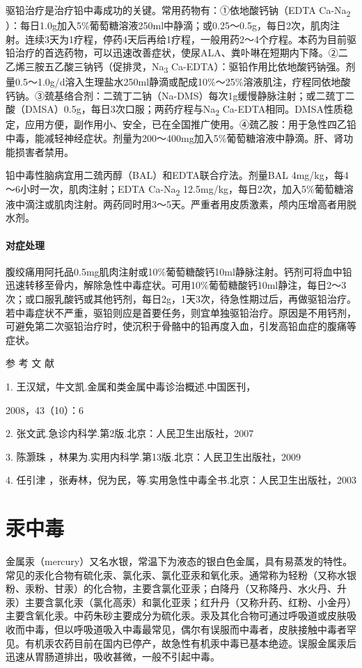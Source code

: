 驱铅治疗是治疗铅中毒成功的关键。常用药物有：①依地酸钙钠（EDTA
Ca-Na\textsubscript{2}
）：每日1.0g加入5\%葡萄糖溶液250ml中静滴；或0.25～0.5g，每日2次，肌肉注射。连续3天为1疗程，停药4天后再给1疗程，一般用药2～4个疗程。本药为目前驱铅治疗的首选药物，可以迅速改善症状，使尿ALA、粪卟啉在短期内下降。②二乙烯三胺五乙酸三钠钙（促排灵，Na\textsubscript{3}
Ca-EDTA）：驱铅作用比依地酸钙钠强。剂量0.5～1.0g/d溶入生理盐水250ml静滴或配成10\%～25\%溶液肌注，疗程同依地酸钙钠。③巯基络合剂：二巯丁二钠（Na-DMS）每次1g缓慢静脉注射；或二巯丁二酸（DMSA）0.5g，每日3次口服；两药疗程与Na\textsubscript{2}
Ca-EDTA相同。DMSA性质稳定，应用方便，副作用小、安全，已在全国推广使用。④巯乙胺：用于急性四乙铅中毒，能减轻神经症状。剂量为200～400mg加入5\%葡萄糖溶液中静滴。肝、肾功能损害者禁用。

铅中毒性脑病宜用二巯丙醇（BAL）和EDTA联合疗法。剂量BAL
4mg/kg，每4～6小时一次，肌肉注射；EDTA Ca-Na\textsubscript{2}
12.5mg/kg，每日2次，加入5\%葡萄糖溶液中滴注或肌肉注射。两药同时用3～5天。严重者用皮质激素，颅内压增高者用脱水剂。

\paragraph{对症处理}

腹绞痛用阿托品0.5mg肌肉注射或10\%葡萄糖酸钙10ml静脉注射。钙剂可将血中铅迅速转移至骨内，解除急性中毒症状。可用10\%葡萄糖酸钙10ml静注，每日2～3次；或口服乳酸钙或其他钙剂，每日2g，1天3次，待急性期过后，再做驱铅治疗。若中毒症状不严重，驱铅则应是首要任务，则宜单独驱铅治疗。原因是不用钙剂，可避免第二次驱铅治疗时，使沉积于骨骼中的铅再度入血，引发高铅血症的腹痛等症状。

\hypertarget{text00157.htmlux5cux23CHP5-6-1-4}{}
参 考 文 献

1. 王汉斌，牛文凯.金属和类金属中毒诊治概述.中国医刊，

2008，43（10）：6

2. 张文武.急诊内科学.第2版.北京：人民卫生出版社，2007

3. 陈灏珠 ，林果为.实用内科学.第13版.北京：人民卫生出版社，2009

4. 任引津
，张寿林，倪为民，等.实用急性中毒全书.北京：人民卫生出版社，2003

\protect\hypertarget{text00158.html}{}{}

\section{汞中毒}

金属汞（mercury）又名水银，常温下为液态的银白色金属，具有易蒸发的特性。常见的汞化合物有硫化汞、氯化汞、氯化亚汞和氧化汞。通常称为轻粉（又称水银粉、汞粉、甘汞）的化合物，主要含氯化亚汞；白降丹（又称降丹、水火丹、升汞）主要含氯化汞（氯化高汞）和氯化亚汞；红升丹（又称升药、红粉、小金丹）主要含氧化汞。中药朱砂主要成分为硫化汞。汞及其化合物可通过呼吸道或皮肤吸收而中毒，但以呼吸道吸入中毒最常见，偶尔有误服而中毒者，皮肤接触中毒者罕见。有机汞农药目前在国内已停产，故急性有机汞中毒已基本绝迹。误服金属汞后迅速从胃肠道排出，吸收甚微，一般不引起中毒。

